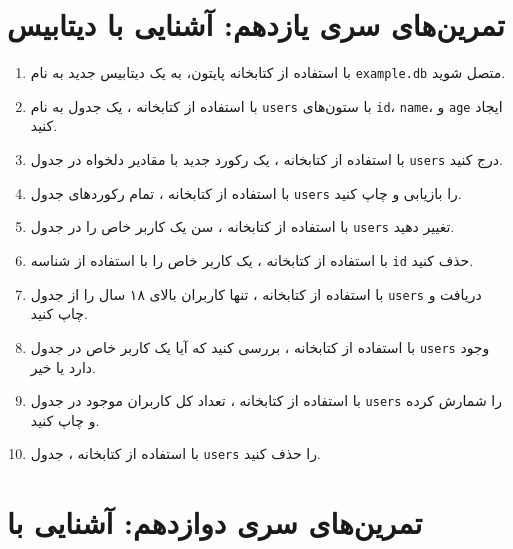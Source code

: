 \documentclass[a4paper,12pt]{article}
\begin{document}
	
	
	
	\newpage
	\section*{تمرین‌های سری یازدهم: آشنایی با دیتابیس}
	
	\begin{enumerate}
		\item با استفاده از کتابخانه  پایتون، به یک دیتابیس جدید به نام \texttt{example.db} متصل شوید.
		\item با استفاده از کتابخانه ، یک جدول به نام \texttt{users} با ستون‌های \texttt{id}، \texttt{name}، و \texttt{age} ایجاد کنید.
		\item با استفاده از کتابخانه ، یک رکورد جدید با مقادیر دلخواه در جدول \texttt{users} درج کنید.
		\item با استفاده از کتابخانه ، تمام رکوردهای جدول \texttt{users} را بازیابی و چاپ کنید.
		\item با استفاده از کتابخانه ، سن یک کاربر خاص را در جدول \texttt{users} تغییر دهید.
		\item با استفاده از کتابخانه ، یک کاربر خاص را با استفاده از شناسه \texttt{id} حذف کنید.
		\item با استفاده از کتابخانه ، تنها کاربران بالای ۱۸ سال را از جدول \texttt{users} دریافت و چاپ کنید.
		\item با استفاده از کتابخانه ، بررسی کنید که آیا یک کاربر خاص در جدول \texttt{users} وجود دارد یا خیر.
		\item با استفاده از کتابخانه ، تعداد کل کاربران موجود در جدول \texttt{users} را شمارش کرده و چاپ کنید.
		\item با استفاده از کتابخانه ، جدول \texttt{users} را حذف کنید.
	\end{enumerate}
	
	\newpage
	\section*{تمرین‌های سری دوازدهم: آشنایی با}
	
\end{document}
